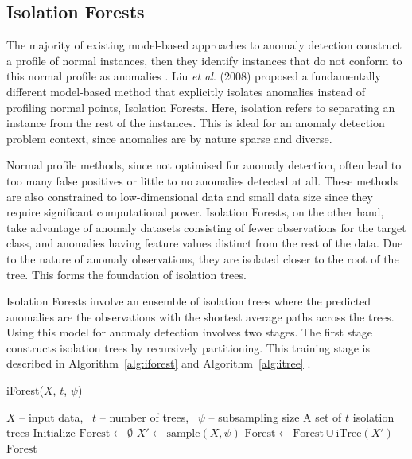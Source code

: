 \documentclass[10pt, conference]{IEEEtran}
\begin{document}
\subsection{Isolation Forests}
The majority of existing model-based approaches to anomaly detection construct a profile of normal instances, then they identify instances that do not conform to this normal profile as anomalies \cite{iforest}. Liu \textit{et al}. (2008) proposed a fundamentally different model-based method that explicitly isolates anomalies instead of profiling normal points, Isolation Forests. Here, isolation refers to separating an instance from the rest of the instances. This is ideal for an anomaly detection problem context, since anomalies are by nature sparse and diverse.

Normal profile methods, since not optimised for anomaly detection, often lead to too many false positives or little to no anomalies detected at all. These methods are also constrained to low-dimensional data and small data size since they require significant computational power. Isolation Forests, on the other hand, take advantage of anomaly datasets consisting of fewer observations for the target class, and anomalies having feature values distinct from the rest of the data. Due to the nature of anomaly observations, they are isolated closer to the root of the tree. This forms the foundation of isolation trees.

Isolation Forests involve an ensemble of isolation trees where the predicted anomalies are the observations with the shortest average paths across the trees. Using this model for anomaly detection involves two stages. The first stage constructs isolation trees by recursively partitioning. This training stage is described in Algorithm~\ref{alg:iforest} and Algorithm~\ref{alg:itree} \cite{iforest2}.

\begin{algorithm}[H]
	\caption{iForest($X$, $t$, $\psi$)}
	\label{alg:iforest}
	\begin{algorithmic}[1]
		\Require $X$ -- input data, \ $t$ -- number of trees, \ $\psi$ -- subsampling size
		\Ensure A set of $t$ isolation trees
		\State Initialize $\text{Forest} \gets \emptyset$
		\State $X' \gets \text{sample}(X, \psi)$
		\State $\text{Forest} \gets \text{Forest} \cup \text{iTree}(X')$
		\EndFor \\
		\Return $\text{Forest}$
	\end{algorithmic}
\end{algorithm}
\end{document}
